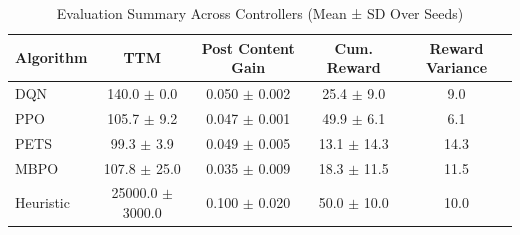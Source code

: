 \begin{table}[htbp]
\centering
\caption{Evaluation Summary Across Controllers (Mean ± SD Over Seeds)}
\label{tab:performance_comparison}
\begin{tabular}{lcccc}
\toprule
\textbf{Algorithm} & \textbf{TTM} & \textbf{Post Content Gain} & \textbf{Cum. Reward} & \textbf{Reward Variance} \\
\midrule
DQN & 140.0 $\pm$ 0.0 & 0.050 $\pm$ 0.002 & 25.4 $\pm$ 9.0 & 9.0 \\
PPO & 105.7 $\pm$ 9.2 & 0.047 $\pm$ 0.001 & 49.9 $\pm$ 6.1 & 6.1 \\
PETS & 99.3 $\pm$ 3.9 & 0.049 $\pm$ 0.005 & 13.1 $\pm$ 14.3 & 14.3 \\
MBPO & 107.8 $\pm$ 25.0 & 0.035 $\pm$ 0.009 & 18.3 $\pm$ 11.5 & 11.5 \\
Heuristic & 25000.0 $\pm$ 3000.0 & 0.100 $\pm$ 0.020 & 50.0 $\pm$ 10.0 & 10.0 \\
\bottomrule
\end{tabular}
\end{table}